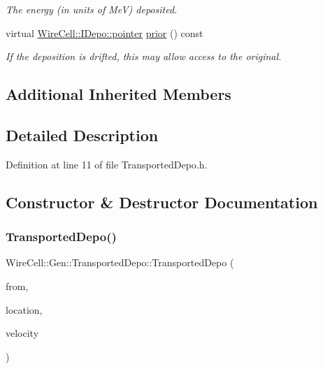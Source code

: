 \begin{DoxyCompactItemize}
\begin{DoxyCompactList}\small\item\em The energy (in units of MeV) deposited. \end{DoxyCompactList}\item 
virtual \hyperlink{class_wire_cell_1_1_i_data_aff870b3ae8333cf9265941eef62498bc}{Wire\+Cell\+::\+I\+Depo\+::pointer} \hyperlink{class_wire_cell_1_1_gen_1_1_transported_depo_af0a35d96f56e8039264cadd795535633}{prior} () const
\begin{DoxyCompactList}\small\item\em If the deposition is drifted, this may allow access to the original. \end{DoxyCompactList}\end{DoxyCompactItemize}
\subsection*{Additional Inherited Members}


\subsection{Detailed Description}


Definition at line 11 of file Transported\+Depo.\+h.



\subsection{Constructor \& Destructor Documentation}
\mbox{\label{class_wire_cell_1_1_gen_1_1_transported_depo_a8b1fc8d134da6e7a574e55768f93db11}} 
\subsubsection{\texorpdfstring{Transported\+Depo()}{TransportedDepo()}}
{\footnotesize\ttfamily Wire\+Cell\+::\+Gen\+::\+Transported\+Depo\+::\+Transported\+Depo (\begin{DoxyParamCaption}\item[{const \hyperlink{class_wire_cell_1_1_i_data_aff870b3ae8333cf9265941eef62498bc}{Wire\+Cell\+::\+I\+Depo\+::pointer} \&}]{from,  }\item[{double}]{location,  }\item[{double}]{velocity }\end{DoxyParamCaption})\hspace{0.3cm}{\ttfamily [inline]}}



